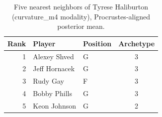 \begin{table}[htbp]
  \centering\small
  \begin{tabular}{rllc}
    \toprule
    Rank & Player & Position & Archetype \\
    \midrule
    1 & Alexey Shved & G & 3 \\
    2 & Jeff Hornacek & G & 3 \\
    3 & Rudy Gay & F & 3 \\
    4 & Bobby Phills & G & 3 \\
    5 & Keon Johnson & G & 2 \\
    \bottomrule
  \end{tabular}
  \caption{Five nearest neighbors of Tyrese Haliburton (curvature_m4 modality), Procrustes-aligned posterior mean.}
  \label{tab:Tyrese_Haliburton_neighbors_curvature_m4}
\end{table}

